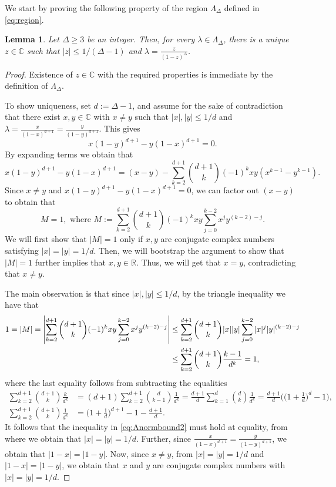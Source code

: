 \documentclass[11pt]{article}
\newtheorem{lemma}[theorem]{Lemma}
\def\Complex{\mathbb{C}}
\def\LambdaD{\Lambda_\Delta}
\newcommand{\abs}[1]{\left|#1\right|}
\begin{document}
We start by proving the following property of the region $\LambdaD$ defined in \eqref{eq:region}. 
\begin{lemma}\label{lem:uniqueness} 
Let $\Delta\geq 3$ be an integer. Then, for every $\lambda\in \LambdaD$, there is a unique $z\in \mathbb{C}$ such that $|z|\leq 1/(\Delta-1)$ and $\lambda=\frac{z}{(1-z)^{\Delta}}$.
\end{lemma}
\begin{proof}
Existence of $z\in \mathbb{C}$ with the required properties is immediate by the definition of $\LambdaD$. 

To show uniqueness, set $d:=\Delta-1$, and assume for the sake of contradiction  that there exist $x,y\in \Complex$ with $x\neq y$ such that $|x|,|y|\leq 1/d$ and $\lambda=\frac{x}{(1-x)^{d+1}}=\frac{y}{(1-y)^{d+1}}$. This gives 
\[x(1-y)^{d+1}-y(1-x)^{d+1}=0.\]
By expanding terms we obtain that
\[x(1-y)^{d+1}-y(1-x)^{d+1}=(x-y)-\sum^{d+1}_{k=2}\binom{d+1}{k}(-1)^{k}xy(x^{k-1}-y^{k-1}).\]
Since $x\neq y$ and $x(1-y)^{d+1}-y(1-x)^{d+1}=0$, we can factor out $(x-y)$ to obtain that 
\[M=1, \mbox{ where } M:=\sum^{d+1}_{k=2}\binom{d+1}{k}(-1)^{k}xy\sum^{k-2}_{j=0}x^{j}y^{(k-2)-j}.\]
We will first show that $\abs{M}=1$ only if $x,y$ are conjugate complex numbers satisfying $|x|=|y|=1/d$. Then, we will bootstrap the argument to show that $|M|=1$ further implies that $x,y\in \mathbb{R}$. Thus, we will get that $x=y$, contradicting that $x\neq y$.

The main observation is that since $|x|,|y|\leq 1/d$,  by the triangle inequality we have that 
\begin{align}
1=\abs{M}=\abs{\sum^{d+1}_{k=2}\binom{d+1}{k}(-1)^{k}xy\sum^{k-2}_{j=0}x^{j}y^{(k-2)-j}}&\leq \sum^{d+1}_{k=2}\binom{d+1}{k}|x||y|\sum^{k-2}_{j=0}|x|^{j}|y|^{(k-2)-j}\notag\\
&\leq \sum^{d+1}_{k=2}\binom{d+1}{k}\frac{k-1}{d^k}=1,\label{eq:Anormbound2}
\end{align}
where the last equality follows from subtracting the equalities
\begin{equation*}
\begin{aligned}
\sum^{d+1}_{k=2}\binom{d+1}{k}\frac{k}{d^k}&=(d+1)\sum^{d+1}_{k=2}\binom{d}{k-1}\frac{1}{d^k}=\frac{d+1}{d}\sum^{d}_{k=1}\binom{d}{k}\frac{1}{d^k}=\frac{d+1}{d}\bigg(\Big(1+\frac{1}{d}\Big)^d-1\bigg),\\
\sum^{d+1}_{k=2}\binom{d+1}{k}\frac{1}{d^k}&=\Big(1+\frac{1}{d}\Big)^{d+1}-1-\frac{d+1}{d}.
\end{aligned}
\end{equation*}
It follows that the inequality in  \eqref{eq:Anormbound2} must hold at equality, from where we obtain  that $|x|=|y|=1/d$. Further, since $\frac{x}{(1-x)^{d+1}}=\frac{y}{(1-y)^{d+1}}$, we obtain that $\abs{1-x}=\abs{1-y}$. Now, since $x\neq y$, from $|x|=|y|=1/d$ and $\abs{1-x}=\abs{1-y}$, we obtain that $x$ and $y$ are conjugate complex numbers with $|x|=|y|=1/d$. 


\end{proof}
\end{document}
